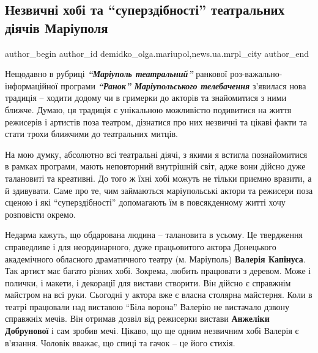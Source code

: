  
 
 
 
 
 
\subsection{Незвичні хобі та \enquote{суперздібності} театральних діячів Маріуполя}
\label{sec:30_06_2021.stz.news.ua.mrpl_city.1.hobi_superzdibnosti_teatr_dijachiv_mrpl}
 
\ifcmt
 author_begin
   author_id demidko_olga.mariupol,news.ua.mrpl_city
 author_end
\fi

Нещодавно в рубриці \emph{\textbf{\enquote{Маріуполь театральний}}} ранкової роз\hyp{}важально-інформаційної
програми \emph{\textbf{\enquote{Ранок} Маріупольського телебачення}} з'явилася нова традиція – ходити
додому чи в гримерки до акторів та знайомитися з ними ближче. Думаю, ця
традиція є унікальною можливістю подивитися на життя режисерів і артистів поза
театром, дізнатися про них незвичні та цікаві факти та стати трохи ближчими до
театральних митців.

На мою думку, абсолютно всі театральні діячі, з якими я встигла познайомитися в
рамках програми, мають неповторний внутрішній світ, адже вони дійсно дуже
талановиті та креативні. До того ж їхні хобі можуть не тільки приємно вразити,
а й здивувати. Саме про те, чим займаються маріупольські актори та режисери
поза сценою і які \enquote{суперздібності} допомагають їм в повсякденному житті хочу
розповісти окремо.


Недарма кажуть, що обдарована людина – талановита в усьому. Це твердження
справедливе і для неординарного, дуже працьовитого актора Донецького
академічного обласного драматичного театру (м. Маріуполь) \textbf{Валерія Капінуса}. Так
артист має багато різних хобі. Зокрема, любить працювати з деревом. Може і
полички, і макети, і декорації для вистави створити. Він дійсно є справжнім
майстром на всі руки. Сьогодні у актора вже є власна столярна майстерня. Коли в
театрі працювали над виставою \enquote{Біла ворона} Валерію не вистачало дзвону
справжніх мечів. Він отримав дозвіл від режисерки вистави \textbf{Анжеліки Добрунової}
і сам зробив мечі. Цікаво, що ще одним незвичним хобі Валерія є в'язання.
Чоловік вважає, що спиці та гачок – це його стихія.

